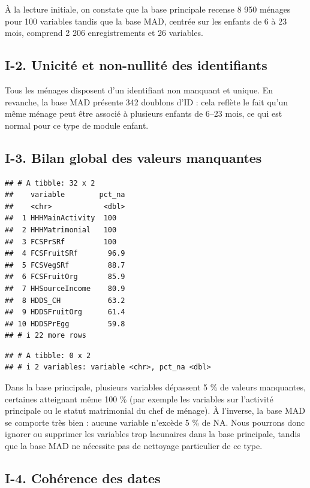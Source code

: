 \documentclass[
]{article}
\begin{document}
À la lecture initiale, on constate que la base principale recense 8 950
ménages pour 100 variables tandis que la base MAD, centrée sur les
enfants de 6 à 23 mois, comprend 2 206 enregistrements et 26 variables.

\hypertarget{i-2.-unicituxe9-et-non-nullituxe9-des-identifiants}{%
\subsection{I-2. Unicité et non-nullité des
identifiants}\label{i-2.-unicituxe9-et-non-nullituxe9-des-identifiants}}

Tous les ménages disposent d'un identifiant non manquant et unique. En
revanche, la base MAD présente 342 doublons d'ID : cela reflète le fait
qu'un même ménage peut être associé à plusieurs enfants de 6--23 mois,
ce qui est normal pour ce type de module enfant.

\hypertarget{i-3.-bilan-global-des-valeurs-manquantes}{%
\subsection{I-3. Bilan global des valeurs
manquantes}\label{i-3.-bilan-global-des-valeurs-manquantes}}

\begin{verbatim}
## # A tibble: 32 x 2
##    variable        pct_na
##    <chr>            <dbl>
##  1 HHHMainActivity  100  
##  2 HHHMatrimonial   100  
##  3 FCSPrSRf         100  
##  4 FCSFruitSRf       96.9
##  5 FCSVegSRf         88.7
##  6 FCSFruitOrg       85.9
##  7 HHSourceIncome    80.9
##  8 HDDS_CH           63.2
##  9 HDDSFruitOrg      61.4
## 10 HDDSPrEgg         59.8
## # i 22 more rows
\end{verbatim}

\begin{verbatim}
## # A tibble: 0 x 2
## # i 2 variables: variable <chr>, pct_na <dbl>
\end{verbatim}

Dans la base principale, plusieurs variables dépassent 5 \% de valeurs
manquantes, certaines atteignant même 100 \% (par exemple les variables
sur l'activité principale ou le statut matrimonial du chef de ménage). À
l'inverse, la base MAD se comporte très bien : aucune variable n'excède
5 \% de NA. Nous pourrons donc ignorer ou supprimer les variables trop
lacunaires dans la base principale, tandis que la base MAD ne nécessite
pas de nettoyage particulier de ce type.

\hypertarget{i-4.-cohuxe9rence-des-dates}{%
\subsection{I-4. Cohérence des
dates}\label{i-4.-cohuxe9rence-des-dates}}
\end{document}
